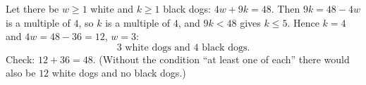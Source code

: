 Let there be $w\ge1$ white and $k\ge1$ black dogs: $4w+9k=48$. Then $9k=48-4w$ is a multiple of $4$, so $k$ is a multiple of $4$, and $9k<48$ gives $k\le5$. Hence $k=4$ and $4w=48-36=12$, $w=3$:
\[
\boxed{3\text{ white dogs and }4\text{ black dogs}}.
\]
Check: $12+36=48$. (Without the condition ``at least one of each'' there would also be $12$ white dogs and no black dogs.)
